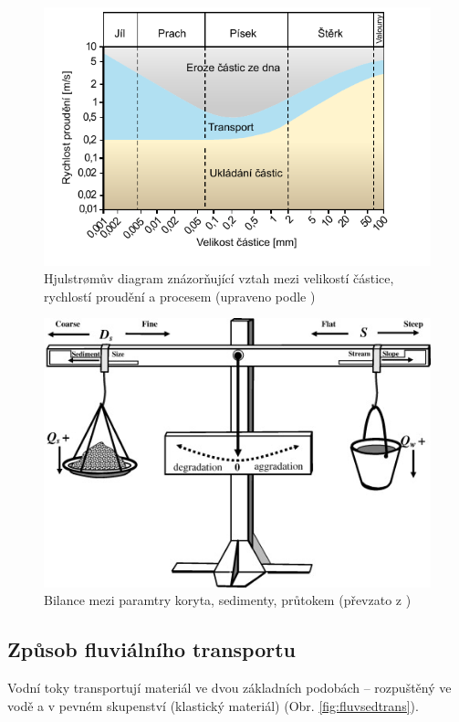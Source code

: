 \begin{figure}
	\centering
	\includegraphics[width = 1\textwidth]{obrazky/fluvial/hjulstr}
	\caption{Hjulstr\o{}mův diagram znázorňující vztah mezi velikostí částice, rychlostí proudění a procesem (upraveno podle \textcite{hjulstromStudiesMorphologicalActivity1935})}
	\label{fig:hjulstr}
\end{figure}

\begin{figure}
	\centering
	\includegraphics[width = 1\textwidth]{obrazky/fluvial/lanes_balance.jpg}
	\caption{Bilance mezi paramtry koryta, sedimenty, průtokem (převzato z \textcite{dustConceptualModelComplex2012})}
	\label{fig:vahy}
\end{figure}

\subsection{Způsob fluviálního transportu}
Vodní toky transportují materiál ve dvou základních podobách -- rozpuštěný ve vodě a v pevném skupenství (klastický materiál) (Obr. \ref{fig:fluvsedtrans}). 

